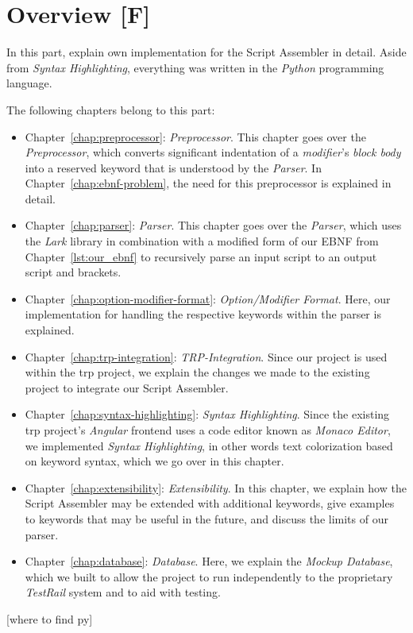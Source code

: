\section{Overview [F]}

In this part, explain own implementation for the Script Assembler in detail. Aside from \textit{Syntax Highlighting}, everything was written in the \textit{Python} programming language.

The following chapters belong to this part:
\begin{itemize}
    \item Chapter~\ref{chap:preprocessor}: \textit{Preprocessor}. This chapter goes over the \textit{Preprocessor}, which converts significant indentation of a \textit{modifier}'s \textit{block body} into a reserved keyword that is understood by the \textit{Parser}. In Chapter~\ref{chap:ebnf-problem}, the need for this preprocessor is explained in detail.
    \item Chapter~\ref{chap:parser}: \textit{Parser}. This chapter goes over the \textit{Parser}, which uses the \textit{Lark} library in combination with a modified form of our EBNF from Chapter~\ref{lst:our_ebnf} to recursively parse an input script to an output script and brackets. 
    \item Chapter~\ref{chap:option-modifier-format}: \textit{Option/Modifier Format}. Here, our implementation for handling the respective keywords within the parser is explained. 
    \item Chapter~\ref{chap:trp-integration}: \textit{TRP-Integration}. Since our project is used within the \gls{trp} project, we explain the changes we made to the existing project to integrate our Script Assembler.
    \item Chapter~\ref{chap:syntax-highlighting}: \textit{Syntax Highlighting}. Since the existing \gls{trp} project's \textit{Angular} frontend uses a code editor known as \textit{Monaco Editor}, we implemented \textit{Syntax Highlighting}, in other words text colorization based on keyword syntax, which we go over in this chapter.
    \item Chapter~\ref{chap:extensibility}: \textit{Extensibility}. In this chapter, we explain how the Script Assembler may be extended with additional keywords, give examples to keywords that may be useful in the future, and discuss the limits of our parser. 
    \item Chapter~\ref{chap:database}: \textit{Database}. Here, we explain the \textit{Mockup Database}, which we built to allow the project to run independently to the proprietary \textit{TestRail} system and to aid with testing.
\end{itemize}

[where to find py]